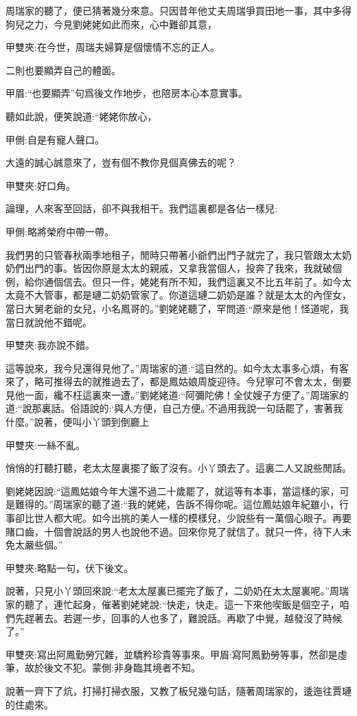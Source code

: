 \begin{parag}
    周瑞家的聽了，便已猜著幾分來意。只因昔年他丈夫周瑞爭買田地一事，其中多得狗兒之力，今見劉姥姥如此而來，心中難卻其意，\begin{note}甲雙夾:在今世，周瑞夫婦算是個懷情不忘的正人。\end{note}二則也要顯弄自己的體面。\begin{note}甲眉:“也要顯弄”句爲後文作地步，也陪房本心本意實事。\end{note}聽如此說，便笑說道:“姥姥你放心，\begin{note}甲側:自是有寵人聲口。\end{note}大遠的誠心誠意來了，豈有個不教你見個真佛去的呢？\begin{note}甲雙夾:好口角。\end{note}論理，人來客至回話，卻不與我相干。我們這裏都是各佔一樣兒:\begin{note}甲側:略將榮府中帶一帶。\end{note}我們男的只管春秋兩季地租子，閒時只帶著小爺們出門子就完了，我只管跟太太奶奶們出門的事。皆因你原是太太的親戚，又拿我當個人，投奔了我來，我就破個例，給你通個信去。但只一件，姥姥有所不知，我們這裏又不比五年前了。如今太太竟不大管事，都是璉二奶奶管家了。你道這璉二奶奶是誰？就是太太的內侄女，當日大舅老爺的女兒，小名鳳哥的。”劉姥姥聽了，罕問道:“原來是他！怪道呢，我當日就說他不錯呢。\begin{note}甲雙夾:我亦說不錯。\end{note}這等說來，我今兒還得見他了。”周瑞家的道:“這自然的。如今太太事多心煩，有客來了，略可推得去的就推過去了，都是鳳姑娘周旋迎待。今兒寧可不會太太，倒要見他一面，纔不枉這裏來一遭。”劉姥姥道:“阿彌陀佛！全仗嫂子方便了。”周瑞家的道:“說那裏話。俗語說的:‘與人方便，自己方便。’不過用我說一句話罷了，害著我什麼。”說著，便叫小丫頭到倒廳上\begin{note}甲雙夾:一絲不亂。\end{note}悄悄的打聽打聽，老太太屋裏擺了飯了沒有。小丫頭去了。這裏二人又說些閒話。
\end{parag}


\begin{parag}
    劉姥姥因說:“這鳳姑娘今年大還不過二十歲罷了，就這等有本事，當這樣的家，可是難得的。”周瑞家的聽了道:“我的姥姥，告訴不得你呢。這位鳳姑娘年紀雖小，行事卻比世人都大呢。如今出挑的美人一樣的模樣兒，少說些有一萬個心眼子。再要賭口齒，十個會說話的男人也說他不過。回來你見了就信了。就只一件，待下人未免太嚴些個。”\begin{note}甲雙夾:略點一句，伏下後文。\end{note}說著，只見小丫頭回來說:“老太太屋裏已擺完了飯了，二奶奶在太太屋裏呢。”周瑞家的聽了，連忙起身，催著劉姥姥說:“快走，快走。這一下來他喫飯是個空子，咱們先趕著去。若遲一步，回事的人也多了，難說話。再歇了中覺，越發沒了時候了。”\begin{note}甲雙夾:寫出阿鳳勤勞冗雜，並驕矜珍貴等事來。甲眉:寫阿鳳勤勞等事，然卻是虛筆，故於後文不犯。蒙側:非身臨其境者不知。\end{note}說著一齊下了炕，打掃打掃衣服，又教了板兒幾句話，隨著周瑞家的，逶迤往賈璉的住處來。
\end{parag}


